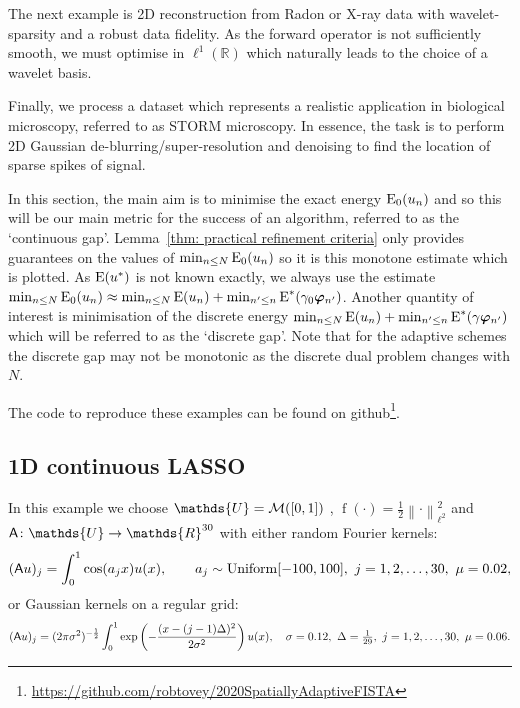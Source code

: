 \documentclass[smallextended]{svjour3}
\let\F\mathds\let\C\mathcal\newcommand{\R}{\F{R}}\newcommand{\A}{\tens{A}}
\newcommand{\norm}[1]{{\left\lVert #1 \right\rVert}}
\newcommand{\op}[1]{\operatorname{#1}}
\newcommand{\1}{\F{1}}
\newcommand*{\varf}[1]{%
	\IfEqCase{#1}{%
		{0}{u}%
		{1}{v}%
		{2}{w}%
	}[u#1]%
}
\newcommand*{\spcf}[1]{%
	\IfEqCase{#1}{%
		{0}{\F{U}}%
		{1}{\F{V}}%
		{2}{\F{W}}%
	}[\F{U}#1]%
}
\newcommand*{\vard}[1]{%
	\IfEqCase{#1}{%
		{0}{\varphi}%
		{1}{\psi}%
	}[\varphi #1]%
}
\newcommand*{\varx}[1]{%
	\IfEqCase{#1}{%
		{0}{x}%
		{1}{y}%
		{2}{z}%
		{3}{r}%
	}[x#1]%
}
\newcommand*{\vars}[1]{%
	\IfEqCase{#1}{%
		{0}{\alpha}%
		{1}{\beta}%
		{2}{\gamma}%
		{3}{a}%
		{4}{b}%
		{5}{c}%
	}[k#1]%
}
\newcommand*{\vvard}[1]{\vec{\vard{#1}}}
\newcommand{\edit}[2]{{\ifmmode\text{\color{red}\sout{\ensuremath{#1}}}\else {\color{red} \sout{#1}}\fi} {\color{darkgreen} #2}}
\begin{document}
	The next example is 2D reconstruction from Radon or X-ray data with wavelet-sparsity\edit{}{ and a robust data fidelity}. As the forward operator is not sufficiently smooth, we must optimise in $\ell^1(\R)$ which naturally leads to the choice of a wavelet basis. 
	
	Finally, we process a dataset which represents a realistic application in biological microscopy, referred to as STORM microscopy. In essence, the task is to perform 2D Gaussian de-blurring/super-resolution and denoising to find the location of sparse spikes of signal.
	
	In this section, the main aim is to minimise the exact \edit{Lasso }{}energy $\op{E}_0(\varf0_n)$ and so this will be our main metric for the success of an algorithm, referred to as the `continuous gap'. Lemma~\ref{thm: practical refinement criteria} only provides guarantees on the values of $\min_{n\leq N}\op{E}_0(\varf0_n)$ so it is this monotone estimate which is plotted. As $\op{E}(\varf0^*)$ is not known exactly, we always use the estimate $\min_{n\leq N}\op{E}_0(\varf0_n) \approx \min_{n\leq N}\op{E}(\varf0_n) + \min_{n'\leq n}\op{E}^*(\vars2_0\vvard0_{n'})$. Another quantity of interest is minimisation of the discrete \edit{Lasso }{}energy $\min_{n\leq N}\op{E}(\varf0_n) + \min_{n'\leq n}\op{E}^*(\vars2\vvard0_{n'})$ which will be referred to as the `discrete gap'. Note that for the adaptive schemes the discrete gap may not be monotonic as the discrete dual problem changes with $N$.
	
	The code to reproduce these examples can be found on github\footnote{\href{https://github.com/robtovey/2020SpatiallyAdaptiveFISTA}{https://github.com/robtovey/2020SpatiallyAdaptiveFISTA}}.
	
	
	\subsection{1D continuous LASSO}\label{sec: 1D Lasso examples}
	In this example we choose $\spcf0=\C M([0,1])$\edit{}{, $\op{f}(\cdot)=\frac12\norm{\cdot}_{\ell^2}^2$} and $\A\colon \spcf0\to \R^{30}$ with either random Fourier kernels:
	\begin{equation}
		(\A\varf0)_j = \int_0^1\cos(\vars3_j\varx0)\varf0(\varx0), \qquad \vars3_j\sim \op{Uniform}[-100,100],\ j=1,2,\ldots,30,\ \mu =0.02, 
	\end{equation}
	or Gaussian kernels on a regular grid:
	\begin{equation}
		(\A\varf0)_j = (2\pi\sigma^2)^{-\frac12}\int_0^1\exp\left(-\frac{(\varx0-(j-1)\Delta)^2}{2\sigma^2}\right)\varf0(\varx0), \quad \sigma=0.12,\ \Delta = \tfrac1{29},\ j=1,2,\ldots,30,\ \mu=0.06.
	\end{equation}
	
\end{document}
